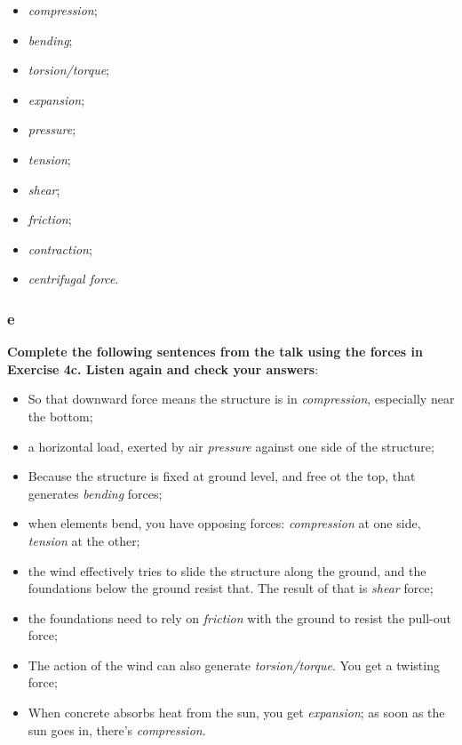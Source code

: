\begin{itemize}

\item\textit{compression};
\item\textit{bending};
\item\textit{torsion/torque};
\item\textit{expansion};
\item\textit{pressure};
\item\textit{tension};
\item\textit{shear};
\item\textit{friction};
\item\textit{contraction};
\item\textit{centrifugal force}.

\end{itemize}

\subsubsection{e}

\textbf{Complete the following sentences from the talk using the forces in Exercise 4c. Listen again and check your answers}:

\begin{itemize}

\item So that downward force means the structure is in \textit{compression}, especially near the bottom;
\item a horizontal load, exerted by air \textit{pressure} against one side of the structure;
\item Because the structure is fixed at ground level, and free ot the top, that generates \textit{bending} forces;
\item when elements bend, you have opposing forces: \textit{compression} at one side, \textit{tension} at the other;
\item the wind effectively tries to slide the structure along the ground, and the foundations below the ground resist that. The result of that is \textit{shear} force;
\item the foundations need to rely on \textit{friction} with the ground to resist the pull-out force;
\item The action of the wind can also generate \textit{torsion/torque}. You get a twisting force;
\item When concrete absorbs heat from the sun, you get \textit{expansion}; as soon as the sun goes in, there's \textit{compression}.

\end{itemize}

